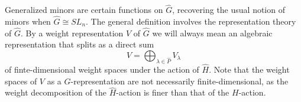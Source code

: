 \documentclass[12pt]{amsart}
\newcommand{\kk}{\Bbbk}%
\newcommand\onto{\twoheadrightarrow}
\newcommand\into{\hookrightarrow}
\DeclareMathOperator{\Hom}{Hom}
\DeclareMathOperator{\corank}{corank}
\theoremstyle{remark}
\numberwithin{equation}{section}
\begin{document}




Generalized minors are certain functions on $\widehat{G}$, recovering the usual notion of minors when $\widehat{G} \cong SL_n$. 
The general definition involves the representation theory of $\widehat{G}$. %
By a weight representation $V$ of $\widehat{G}$ we will always mean an algebraic representation that splits as a direct sum
\[
V = \bigoplus_{\lambda \in \widehat{P}} V_\lambda
\]
of finte-dimensional weight spaces under the action of $\widehat{H}$. Note that the weight spaces of $V$ as a $G$-representation are not necessarily finite-dimensional, as the weight decomposition of the $\widehat{H}$-action is finer than that of the $H$-action. 
\end{document}
